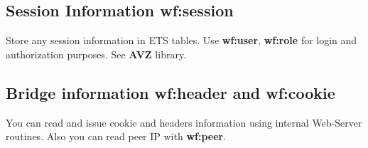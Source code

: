 \subsection{Session Information {\bf wf:session}}
Store any session information in ETS tables. Use {\bf wf:user}, {\bf wf:role} for
login and authorization purposes. See {\bf AVZ} library.

\subsection{Bridge information {\bf wf:header} and {\bf wf:cookie}}
You can read and issue cookie and headers information using internal Web-Server routines.
Also you can read peer IP with {\bf wf:peer}.

